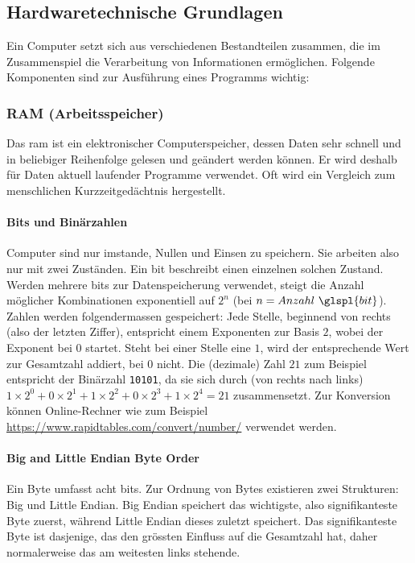 \documentclass[11pt, a4paper]{article}
\begin{document}
\subsection{Hardwaretechnische Grundlagen}
Ein Computer setzt sich aus verschiedenen Bestandteilen zusammen, die im Zusammenspiel die Verarbeitung von Informationen ermöglichen. Folgende Komponenten sind zur Ausführung eines Programms wichtig:

\subsubsection{RAM (Arbeitsspeicher)}
Das \gls{ram} ist ein elektronischer Computerspeicher, dessen Daten sehr schnell und in beliebiger Reihenfolge gelesen und geändert werden können. Er wird deshalb für Daten aktuell laufender Programme verwendet. Oft wird ein Vergleich zum menschlichen Kurzzeitgedächtnis hergestellt. 
\paragraph{Bits und Binärzahlen}
Computer sind nur imstande, Nullen und Einsen zu speichern. Sie arbeiten also nur mit zwei Zuständen. Ein \gls{bit} beschreibt einen einzelnen solchen Zustand. Werden mehrere \glspl{bit} zur Datenspeicherung verwendet, steigt die Anzahl möglicher Kombinationen exponentiell auf \( 2^n \) (bei \(n = Anzahl~\glspl{bit}\)). Zahlen werden folgendermassen gespeichert: Jede Stelle, beginnend von rechts (also der letzten Ziffer), entspricht einem Exponenten zur Basis \(2\), wobei der Exponent bei \(0\) startet. Steht bei einer Stelle eine \(1\), wird der entsprechende Wert zur Gesamtzahl addiert, bei \(0\) nicht. Die (dezimale) Zahl \(21\) zum Beispiel entspricht der Binärzahl \texttt{10101}, da sie sich durch (von rechts nach links) \(1 \times 2^0 + 0 \times 2^1 + 1 \times 2^2 + 0 \times 2^3 + 1 \times 2^4 = 21\) zusammensetzt. Zur Konversion können Online-Rechner wie zum Beispiel \url{https://www.rapidtables.com/convert/number/} verwendet werden.

\paragraph{Big and Little Endian Byte Order}
Ein Byte umfasst acht \glspl{bit}. Zur Ordnung von Bytes existieren zwei Strukturen: Big und Little Endian. Big Endian speichert das wichtigste, also signifikanteste Byte zuerst, während Little Endian dieses zuletzt speichert. Das signifikanteste Byte ist dasjenige, das den grössten Einfluss auf die Gesamtzahl hat, daher normalerweise das am weitesten links stehende.
\end{document}
